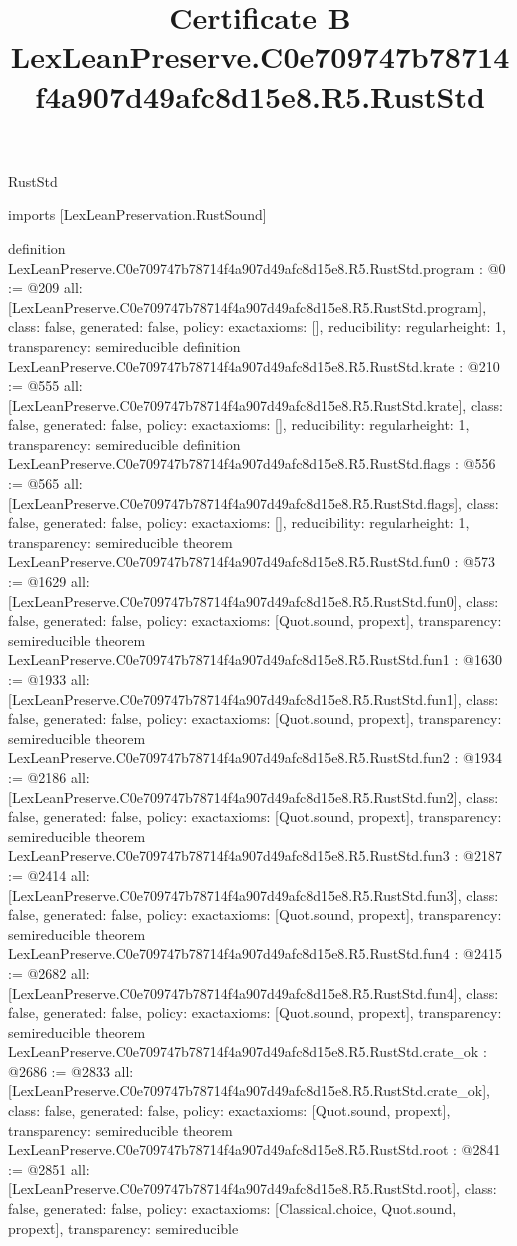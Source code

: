 \begin{lexlean}{RustStd}
\title{Certificate B LexLeanPreserve.C0e709747b78714f4a907d49afc8d15e8.R5.RustStd}
\begin{coremodule}
imports [LexLeanPreservation.RustSound]

definition LexLeanPreserve.C0e709747b78714f4a907d49afc8d15e8.R5.RustStd.program : @0 := @209 {
  all: [LexLeanPreserve.C0e709747b78714f4a907d49afc8d15e8.R5.RustStd.program],
  class: false,
  generated: false,
  policy: exact{axioms: []},
  reducibility: regular{height: 1},
  transparency: semireducible
}
definition LexLeanPreserve.C0e709747b78714f4a907d49afc8d15e8.R5.RustStd.krate : @210 := @555 {
  all: [LexLeanPreserve.C0e709747b78714f4a907d49afc8d15e8.R5.RustStd.krate],
  class: false,
  generated: false,
  policy: exact{axioms: []},
  reducibility: regular{height: 1},
  transparency: semireducible
}
definition LexLeanPreserve.C0e709747b78714f4a907d49afc8d15e8.R5.RustStd.flags : @556 := @565 {
  all: [LexLeanPreserve.C0e709747b78714f4a907d49afc8d15e8.R5.RustStd.flags],
  class: false,
  generated: false,
  policy: exact{axioms: []},
  reducibility: regular{height: 1},
  transparency: semireducible
}
theorem LexLeanPreserve.C0e709747b78714f4a907d49afc8d15e8.R5.RustStd.fun0 : @573 := @1629 {
  all: [LexLeanPreserve.C0e709747b78714f4a907d49afc8d15e8.R5.RustStd.fun0],
  class: false,
  generated: false,
  policy: exact{axioms: [Quot.sound, propext]},
  transparency: semireducible
}
theorem LexLeanPreserve.C0e709747b78714f4a907d49afc8d15e8.R5.RustStd.fun1 : @1630 := @1933 {
  all: [LexLeanPreserve.C0e709747b78714f4a907d49afc8d15e8.R5.RustStd.fun1],
  class: false,
  generated: false,
  policy: exact{axioms: [Quot.sound, propext]},
  transparency: semireducible
}
theorem LexLeanPreserve.C0e709747b78714f4a907d49afc8d15e8.R5.RustStd.fun2 : @1934 := @2186 {
  all: [LexLeanPreserve.C0e709747b78714f4a907d49afc8d15e8.R5.RustStd.fun2],
  class: false,
  generated: false,
  policy: exact{axioms: [Quot.sound, propext]},
  transparency: semireducible
}
theorem LexLeanPreserve.C0e709747b78714f4a907d49afc8d15e8.R5.RustStd.fun3 : @2187 := @2414 {
  all: [LexLeanPreserve.C0e709747b78714f4a907d49afc8d15e8.R5.RustStd.fun3],
  class: false,
  generated: false,
  policy: exact{axioms: [Quot.sound, propext]},
  transparency: semireducible
}
theorem LexLeanPreserve.C0e709747b78714f4a907d49afc8d15e8.R5.RustStd.fun4 : @2415 := @2682 {
  all: [LexLeanPreserve.C0e709747b78714f4a907d49afc8d15e8.R5.RustStd.fun4],
  class: false,
  generated: false,
  policy: exact{axioms: [Quot.sound, propext]},
  transparency: semireducible
}
theorem LexLeanPreserve.C0e709747b78714f4a907d49afc8d15e8.R5.RustStd.crate_ok : @2686 := @2833 {
  all: [LexLeanPreserve.C0e709747b78714f4a907d49afc8d15e8.R5.RustStd.crate_ok],
  class: false,
  generated: false,
  policy: exact{axioms: [Quot.sound, propext]},
  transparency: semireducible
}
theorem LexLeanPreserve.C0e709747b78714f4a907d49afc8d15e8.R5.RustStd.root : @2841 := @2851 {
  all: [LexLeanPreserve.C0e709747b78714f4a907d49afc8d15e8.R5.RustStd.root],
  class: false,
  generated: false,
  policy: exact{axioms: [Classical.choice, Quot.sound, propext]},
  transparency: semireducible
}


\end{coremodule}
\end{lexlean}
